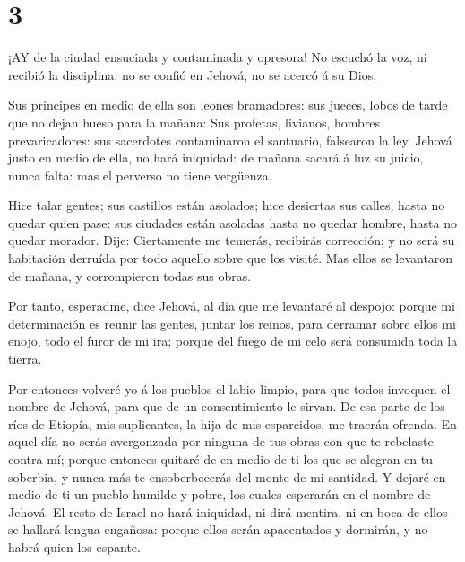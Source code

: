 \hypertarget{section-2}{%
\section{3}\label{section-2}}

 ¡AY de la ciudad ensuciada y contaminada y opresora!
 No escuchó la voz, ni recibió la disciplina: no se confió
en Jehová, no se acercó á su Dios.

 Sus príncipes en medio de ella son leones bramadores: sus
jueces, lobos de tarde que no dejan hueso para la mañana: 
Sus profetas, livianos, hombres prevaricadores: sus sacerdotes
contaminaron el santuario, falsearon la ley.  Jehová justo
en medio de ella, no hará iniquidad: de mañana sacará á luz su juicio,
nunca falta: mas el perverso no tiene vergüenza.

 Hice talar gentes; sus castillos están asolados; hice
desiertas sus calles, hasta no quedar quien pase: sus ciudades están
asoladas hasta no quedar hombre, hasta no quedar morador. 
Dije: Ciertamente me temerás, recibirás corrección; y no será su
habitación derruída por todo aquello sobre que los visité. Mas ellos se
levantaron de mañana, y corrompieron todas sus obras.

 Por tanto, esperadme, dice Jehová, al día que me levantaré
al despojo: porque mi determinación es reunir las gentes, juntar los
reinos, para derramar sobre ellos mi enojo, todo el furor de mi ira;
porque del fuego de mi celo será consumida toda la tierra.

 Por entonces volveré yo á los pueblos el labio limpio, para
que todos invoquen el nombre de Jehová, para que de un consentimiento le
sirvan.  De esa parte de los ríos de Etiopía, mis
suplicantes, la hija de mis esparcidos, me traerán ofrenda.
 En aquel día no serás avergonzada por ninguna de tus obras
con que te rebelaste contra mí; porque entonces quitaré de en medio de
ti los que se alegran en tu soberbia, y nunca más te ensoberbecerás del
monte de mi santidad.  Y dejaré en medio de ti un pueblo
humilde y pobre, los cuales esperarán en el nombre de Jehová.
 El resto de Israel no hará iniquidad, ni dirá mentira, ni
en boca de ellos se hallará lengua engañosa: porque ellos serán
apacentados y dormirán, y no habrá quien los espante.

